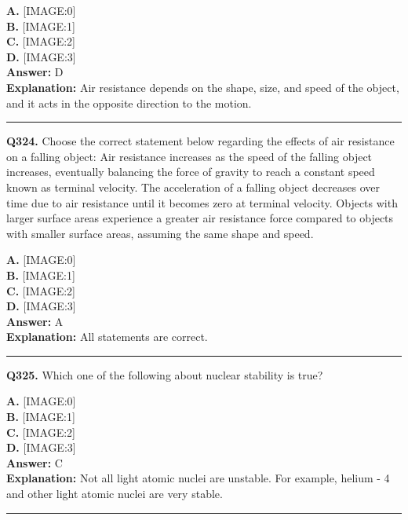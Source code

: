\documentclass[12pt]{article}
\begin{document}
\textbf{A.} [IMAGE:0] \\
\textbf{B.} [IMAGE:1] \\
\textbf{C.} [IMAGE:2] \\
\textbf{D.} [IMAGE:3] \\

\textbf{Answer:} D \\
\textbf{Explanation:} Air resistance depends on the shape, size, and speed of the object, and it acts in the opposite direction to the motion.

\hrule
\vspace{1em}


\noindent
\textbf{Q324.} Choose the correct statement below regarding the effects of air resistance on a falling object:
Air resistance increases as the speed of the falling object increases, eventually balancing the force of gravity to reach a constant speed known as terminal velocity.
The acceleration of a falling object decreases over time due to air resistance until it becomes zero at terminal velocity.
Objects with larger surface areas experience a greater air resistance force compared to objects with smaller surface areas, assuming the same shape and speed.



\textbf{A.} [IMAGE:0] \\
\textbf{B.} [IMAGE:1] \\
\textbf{C.} [IMAGE:2] \\
\textbf{D.} [IMAGE:3] \\

\textbf{Answer:} A \\
\textbf{Explanation:} All statements are correct.

\hrule
\vspace{1em}


\noindent
\textbf{Q325.} Which one of the following about nuclear stability is true?



\textbf{A.} [IMAGE:0] \\
\textbf{B.} [IMAGE:1] \\
\textbf{C.} [IMAGE:2] \\
\textbf{D.} [IMAGE:3] \\

\textbf{Answer:} C \\
\textbf{Explanation:} Not all light atomic nuclei are unstable. For example, helium - 4 and other light atomic nuclei are very stable.

\hrule
\vspace{1em}
\end{document}
